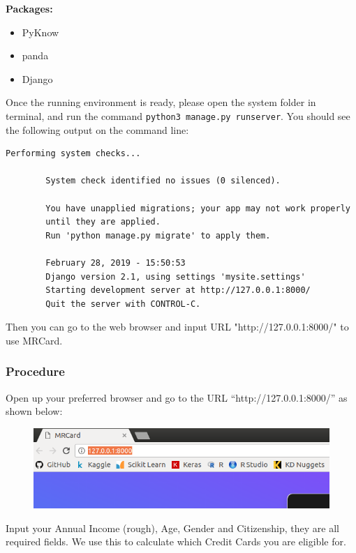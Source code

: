 	\textbf{Packages:}
	\begin{itemize}
		\item PyKnow
		\item panda
		\item Django
	\end{itemize}

	Once the running environment is ready, please open the system folder in terminal, and run the command \verb|python3 manage.py runserver|. You should see the following output on the command line:

	\begin{lstlisting}[style=DOS, frame=single, gobble=7, tabsize=4, showstringspaces=false]
		Performing system checks...

		System check identified no issues (0 silenced).

		You have unapplied migrations; your app may not work properly
		until they are applied.
		Run 'python manage.py migrate' to apply them.

		February 28, 2019 - 15:50:53
		Django version 2.1, using settings 'mysite.settings'
		Starting development server at http://127.0.0.1:8000/
		Quit the server with CONTROL-C.
	\end{lstlisting}

	Then you can go to the web browser and input URL "http://127.0.0.1:8000/" to use MRCard.


	\subsubsection{Procedure} %
	\label{ssub:start}
		Open up your preferred browser and go to the URL “http://127.0.0.1:8000/” as shown below:

		\begin{figure}[H]
			\centering
			\includegraphics[width=\linewidth]{img/url.png}
		\end{figure}

		Input your Annual Income (rough), Age, Gender and Citizenship, they are all required fields. We use this to calculate which Credit Cards you are eligible for.

